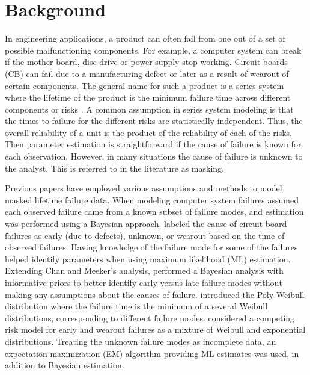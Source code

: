 \documentclass[11pt]{article}
\begin{document}
\section{Background}
\label{sec:Background}
In engineering applications, a product can often fail from one out of a set of possible malfunctioning components.  For example, a computer system can break if the mother board, disc drive or power supply stop working.  Circuit boards (CB) can fail due to a manufacturing defect or later as a result of wearout of certain components.  The general name for such a product is a series system where the lifetime of the product is the minimum failure time across different components or risks \citep[Chapter 5]{nelson}.  A common assumption in series system modeling is that the times to failure for the different risks are statistically independent.  Thus, the overall reliability of a unit is the product of the reliability of each of the risks.  Then parameter estimation is straightforward if the cause of failure is known for each observation.  However, in many situations the cause of failure is unknown to the analyst. This is referred to in the literature as masking.

Previous papers have employed various assumptions and methods to model masked lifetime failure data.  When modeling computer system failures \citet{reiser} assumed each observed failure came from a known subset of failure modes, and estimation was performed using a Bayesian approach.  \cite{chan} labeled the cause of circuit board failures as early (due to defects), unknown, or wearout based on the time of observed failures.  Having knowledge of the failure mode for some of the failures helped identify parameters when using maximum likelihood (ML) estimation.  Extending Chan and Meeker's analysis, \citet{basu} performed a Bayesian analysis with informative priors to better identify early versus late failure modes without making any assumptions about the causes of failure.  \cite{berger} introduced the Poly-Weibull distribution where the failure time is the minimum of a several Weibull distributions, corresponding to different failure modes.  \cite{ranjan} considered a competing risk model for early and wearout failures as a mixture of Weibull and exponential distributions.  Treating the unknown failure modes as incomplete data, an expectation maximization (EM) algorithm providing ML estimates was used, in addition to Bayesian estimation.
\end{document}
